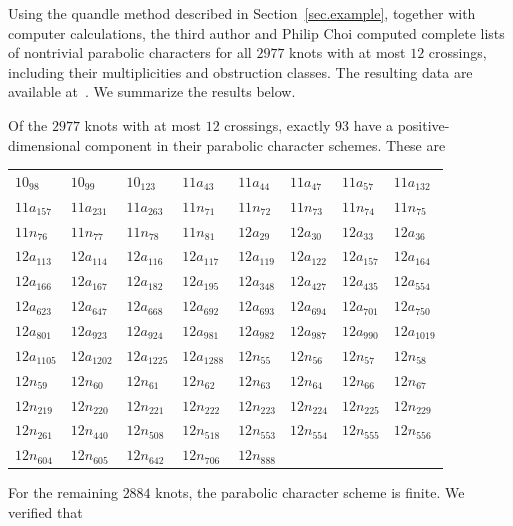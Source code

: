 \documentclass[12pt,reqno]{amsart}
\theoremstyle{definition}
\begin{document}
    Using the quandle method described in Section~\ref{sec.example}, together with computer calculations, the third author and Philip Choi computed complete lists of nontrivial parabolic characters for all $2977$ knots with at most $12$ crossings, including their multiplicities and obstruction classes. The resulting data are available at~\cite{diagramsite}. We summarize the results below.


	
	Of the $2977$ knots with at most $12$ crossings, exactly $93$ have a positive-dimensional component in their parabolic character schemes. These are
	{\small
		\setlength{\tabcolsep}{4pt}
		\begin{longtable}{*{8}{l}}
			$10_{98}$ & $10_{99}$ & $10_{123}$ & $11a_{43}$ & $11a_{44}$ & $11a_{47}$ & $11a_{57}$ & $11a_{132}$ \\
			$11a_{157}$ & $11a_{231}$ & $11a_{263}$ & $11n_{71}$ & $11n_{72}$ & $11n_{73}$ & $11n_{74}$ & $11n_{75}$ \\
			$11n_{76}$ & $11n_{77}$ & $11n_{78}$ & $11n_{81}$ & $12a_{29}$ & $12a_{30}$ & $12a_{33}$ & $12a_{36}$ \\
			$12a_{113}$ & $12a_{114}$ & $12a_{116}$ & $12a_{117}$ & $12a_{119}$ & $12a_{122}$ & $12a_{157}$ & $12a_{164}$ \\
			$12a_{166}$ & $12a_{167}$ & $12a_{182}$ & $12a_{195}$ & $12a_{348}$ & $12a_{427}$ & $12a_{435}$ & $12a_{554}$ \\
			$12a_{623}$ & $12a_{647}$ & $12a_{668}$ & $12a_{692}$ & $12a_{693}$ & $12a_{694}$ & $12a_{701}$ & $12a_{750}$ \\
			$12a_{801}$ & $12a_{923}$ & $12a_{924}$ & $12a_{981}$ & $12a_{982}$ & $12a_{987}$ & $12a_{990}$ & $12a_{1019}$ \\
			$12a_{1105}$ & $12a_{1202}$ & $12a_{1225}$ & $12a_{1288}$ & $12n_{55}$ & $12n_{56}$ & $12n_{57}$ & $12n_{58}$ \\
			$12n_{59}$ & $12n_{60}$ & $12n_{61}$ & $12n_{62}$ & $12n_{63}$ & $12n_{64}$ & $12n_{66}$ & $12n_{67}$ \\
			$12n_{219}$ & $12n_{220}$ & $12n_{221}$ & $12n_{222}$ & $12n_{223}$ & $12n_{224}$ & $12n_{225}$ & $12n_{229}$ \\
			$12n_{261}$ & $12n_{440}$ & $12n_{508}$ & $12n_{518}$ & $12n_{553}$ & $12n_{554}$ & $12n_{555}$ & $12n_{556}$ \\
			$12n_{604}$ & $12n_{605}$ & $12n_{642}$ & $12n_{706}$ & $12n_{888}$ & & &
		\end{longtable}
	}
	\noindent
	For the remaining $2884$ knots, the parabolic character scheme is finite. We verified that
\end{document}
